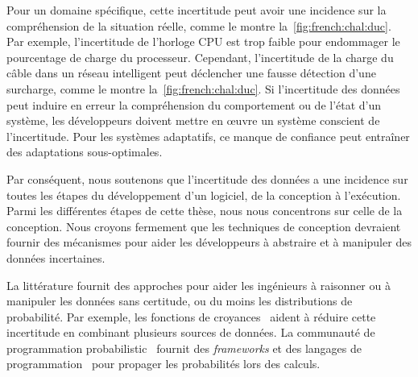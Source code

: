 %
Pour un domaine spécifique, cette incertitude peut avoir une incidence sur la compréhension de la situation réelle, comme le montre la~\cref{fig:french:chal:duc}. 
Par exemple, l'incertitude de l'horloge CPU est trop faible pour endommager le pourcentage de charge du processeur. 
Cependant, l'incertitude de la charge du câble dans un réseau intelligent peut déclencher une fausse détection d'une surcharge, comme le montre la~\cref{fig:french:chal:duc}. 
Si l'incertitude des données peut induire en erreur la compréhension du comportement ou de l'état d'un système, les développeurs doivent mettre en œuvre un système conscient de l'incertitude. 
Pour les systèmes adaptatifs, ce manque de confiance peut entraîner des adaptations sous-optimales.

%
Par conséquent, nous soutenons que l'incertitude des données a une incidence sur toutes les étapes du développement d'un logiciel, de la conception à l'exécution.
Parmi les différentes étapes de cette thèse, nous nous concentrons sur celle de la conception.
Nous croyons fermement que les techniques de conception devraient fournir des mécanismes pour aider les développeurs à abstraire et à manipuler des données incertaines.

%
La littérature fournit des approches pour aider les ingénieurs à raisonner ou à manipuler les données sans certitude, ou du moins les distributions de probabilité.
Par exemple, les fonctions de croyances~\cite{shafer1992dempster} aident à réduire cette incertitude en combinant plusieurs sources de données.
La communauté de programmation probabilistic~\cite{DBLP:conf/icse/GordonHNR14} fournit des \textit{frameworks} et des langages de programmation~\cite{url:InferNET18, baudin2017openturns} pour propager les probabilités lors des calculs.

